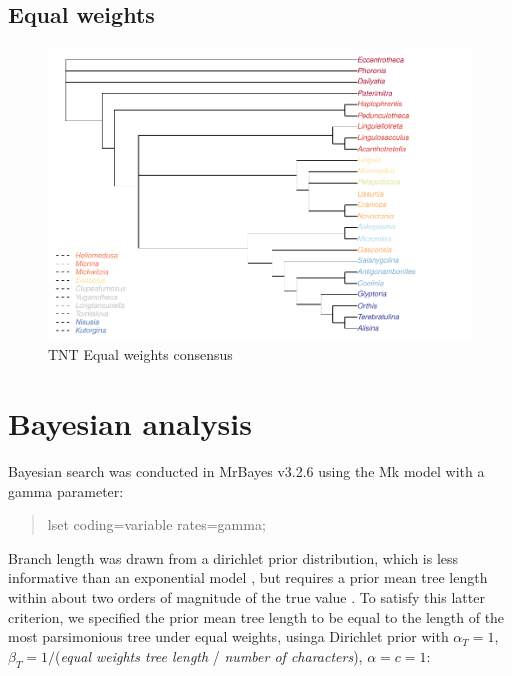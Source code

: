 \documentclass[]{book}
\theoremstyle{definition}
\theoremstyle{definition}
\theoremstyle{definition}
\theoremstyle{remark}
\begin{document}
\hypertarget{equal-weights}{%
\section{Equal weights}\label{equal-weights}}

\begin{figure}
\centering
\includegraphics{Brachiopod_phylogeny_files/figure-latex/unnamed-chunk-12-1.pdf}
\caption{\label{fig:unnamed-chunk-12}TNT Equal weights consensus}
\end{figure}

\hypertarget{bayesian-analysis}{%
\chapter{Bayesian analysis}\label{bayesian-analysis}}

Bayesian search was conducted in MrBayes v3.2.6 \citep{Ronquist2012}
using the Mk model \citep{Lewis2001} with a gamma parameter:

\begin{quote}
lset coding=variable rates=gamma;
\end{quote}

Branch length was drawn from a dirichlet prior distribution, which is
less informative than an exponential model \citep{Rannala2012}, but
requires a prior mean tree length within about two orders of magnitude
of the true value \citep{Zhang2012}. To satisfy this latter criterion,
we specified the prior mean tree length to be equal to the length of the
most parsimonious tree under equal weights, usinga Dirichlet prior with
\(α_T = 1\), \(β_T = 1/\)(\emph{equal weights tree length} /
\emph{number of characters}), \(α = c = 1\):
\end{document}
